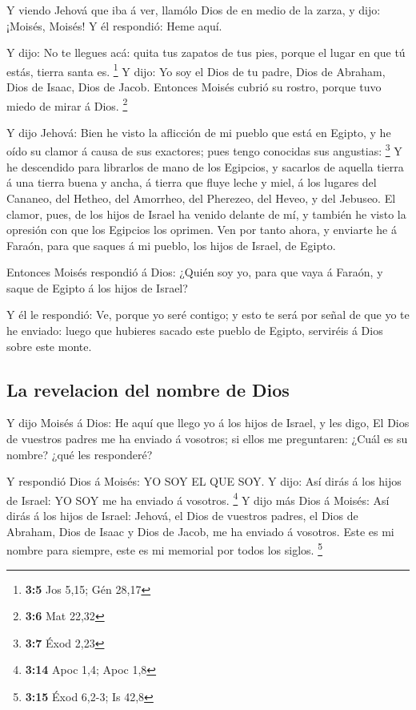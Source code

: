  Y viendo Jehová que iba á ver, llamólo Dios de en medio
de la zarza, y dijo: ¡Moisés, Moisés! Y él respondió: Heme aquí.

 Y dijo: No te llegues acá: quita tus zapatos de tus pies,
porque el lugar en que tú estás, tierra santa es. \footnote{\textbf{3:5}
  Jos 5,15; Gén 28,17}  Y dijo: Yo soy el Dios de tu
padre, Dios de Abraham, Dios de Isaac, Dios de Jacob. Entonces Moisés
cubrió su rostro, porque tuvo miedo de mirar á Dios. \footnote{\textbf{3:6}
  Mat 22,32}

 Y dijo Jehová: Bien he visto la aflicción de mi pueblo
que está en Egipto, y he oído su clamor á causa de sus exactores; pues
tengo conocidas sus angustias: \footnote{\textbf{3:7} Éxod 2,23}
 Y he descendido para librarlos de mano de los Egipcios, y
sacarlos de aquella tierra á una tierra buena y ancha, á tierra que
fluye leche y miel, á los lugares del Cananeo, del Hetheo, del Amorrheo,
del Pherezeo, del Heveo, y del Jebuseo.  El clamor, pues,
de los hijos de Israel ha venido delante de mí, y también he visto la
opresión con que los Egipcios los oprimen.  Ven por tanto
ahora, y enviarte he á Faraón, para que saques á mi pueblo, los hijos de
Israel, de Egipto.

 Entonces Moisés respondió á Dios: ¿Quién soy yo, para
que vaya á Faraón, y saque de Egipto á los hijos de Israel?

 Y él le respondió: Ve, porque yo seré contigo; y esto te
será por señal de que yo te he enviado: luego que hubieres sacado este
pueblo de Egipto, serviréis á Dios sobre este monte.

\hypertarget{la-revelacion-del-nombre-de-dios}{%
\subsection{La revelacion del nombre de
Dios}\label{la-revelacion-del-nombre-de-dios}}

 Y dijo Moisés á Dios: He aquí que llego yo á los hijos
de Israel, y les digo, El Dios de vuestros padres me ha enviado á
vosotros; si ellos me preguntaren: ¿Cuál es su nombre? ¿qué les
responderé?

 Y respondió Dios á Moisés: YO SOY EL QUE SOY. Y dijo:
Así dirás á los hijos de Israel: YO SOY me ha enviado á vosotros.
\footnote{\textbf{3:14} Apoc 1,4; Apoc 1,8}  Y dijo más
Dios á Moisés: Así dirás á los hijos de Israel: Jehová, el Dios de
vuestros padres, el Dios de Abraham, Dios de Isaac y Dios de Jacob, me
ha enviado á vosotros. Este es mi nombre para siempre, este es mi
memorial por todos los siglos. \footnote{\textbf{3:15} Éxod 6,2-3; Is
  42,8}

